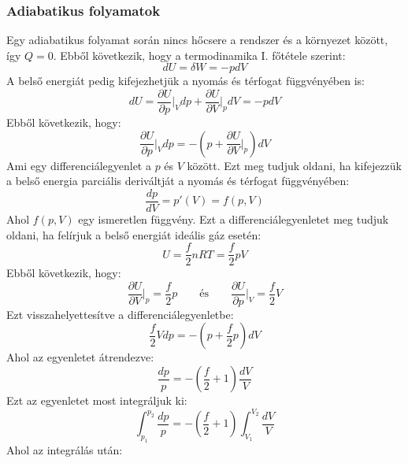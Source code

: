 \documentclass[../main.tex]{subfiles}
\begin{document}
\subsubsection{Adiabatikus folyamatok}
Egy adiabatikus folyamat során nincs hőcsere a rendszer és a környezet között, így $Q = 0$. Ebből következik, hogy a termodinamika I. főtétele szerint:
\begin{equation}
    dU = \delta W = - p dV
\end{equation}
A belső energiát pedig kifejezhetjük a nyomás és térfogat függvényében is:
\begin{equation}
    dU = \frac{\partial U}{\partial p}\bigg|_{V} dp + \frac{\partial U}{\partial V}\bigg|_{p} dV = - p dV
\end{equation}
Ebből következik, hogy:
\begin{equation}
   \frac{\partial U}{\partial p}\bigg|_{V} dp = - \left(p + \frac{\partial U}{\partial V}\bigg|_{p}\right) dV
\end{equation}
Ami egy differenciálegyenlet a $p$ és $V$ között. Ezt meg tudjuk oldani, ha kifejezzük a belső energia parciális deriváltját a nyomás és térfogat függvényében:
\begin{equation}
    \frac{dp}{dV} = p'(V) = f(p, V)
\end{equation}
Ahol $f(p, V)$ egy ismeretlen függvény. Ezt a differenciálegyenletet meg tudjuk oldani, ha felírjuk a belső energiát ideális gáz esetén:
\begin{equation}
    U = \frac{f}{2} n R T = \frac{f}{2} p V
\end{equation}
Ebből következik, hogy:
\begin{equation}
    \frac{\partial U}{\partial V}\bigg|_{p} = \frac{f}{2} p \qquad \text{és} \qquad \frac{\partial U}{\partial p}\bigg|_{V} = \frac{f}{2} V
\end{equation}
Ezt visszahelyettesítve a differenciálegyenletbe:
\begin{equation}
    \frac{f}{2} V dp = - \left(p + \frac{f}{2} p\right) dV
\end{equation}
Ahol az egyenletet átrendezve:
\begin{equation}
    \frac{dp}{p} = - \left(\frac{f}{2} + 1\right) \frac{dV}{V}
\end{equation}
Ezt az egyenletet most integráljuk ki:
\begin{equation}
    \int_{p_1}^{p_2} \frac{dp}{p} = - \left(\frac{f}{2} + 1\right) \int_{V_1}^{V_2} \frac{dV}{V}
\end{equation}
Ahol az integrálás után:
\end{document}
